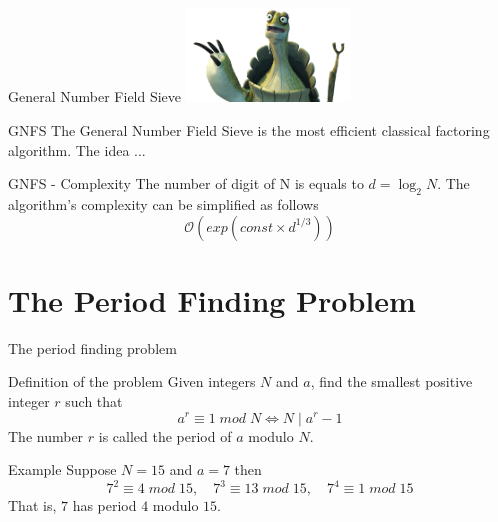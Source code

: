 \documentclass{beamer}
\begin{document}
    \begin{frame}{General Number Field Sieve}
        \centering
        \includegraphics[height=2.5cm, keepaspectratio]{images/turtle.png}
        \begin{alertblock}{GNFS}
            The General Number Field Sieve is the most efficient classical factoring algorithm. The idea ...
        \end{alertblock}
        \begin{exampleblock}{GNFS - Complexity}
            The number of digit of N is equals to $d = \log_2N$.
            The algorithm's complexity can be simplified as follows
            $$\mathcal{O}(exp(const \times d^{1/3}))$$
        \end{exampleblock}
    \end{frame}

    \section{The Period Finding Problem}
    \begin{frame}{The period finding problem}
        \begin{alertblock}{Definition of the problem}
            Given integers $N$ and $a$, find the smallest positive integer $r$ such that
            $$ a^r \equiv 1 \; mod \; N \iff N \; | \; a^r - 1$$
            The number $r$ is called the period of $a$ modulo $N$.
        \end{alertblock}

        \begin{exampleblock}{Example}
            Suppose $N = 15$ and $a=7$ then
            \begin{equation*}
                    7^2 \equiv 4 \; mod \; 15, \quad
                    7^3 \equiv 13 \; mod \; 15, \quad
                    7^4 \equiv 1 \; mod \; 15 
            \end{equation*}
            That is, $7$ has period $4$ modulo $15$.
        \end{exampleblock}
    \end{frame}
    
\end{document}
